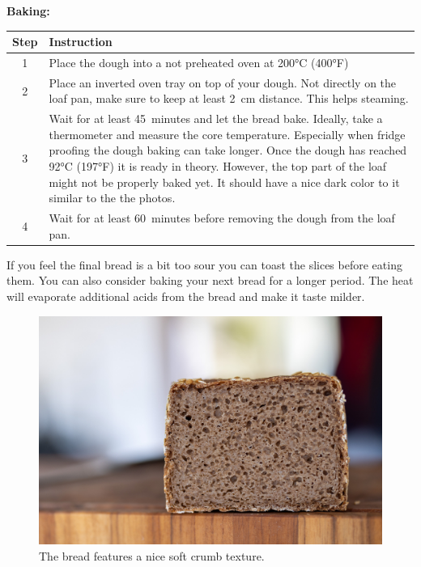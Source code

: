 \noindent\textbf{Baking:}
\begin{center}
\begin{tabular}{|c|p{12cm}|}
    \hline
    \textbf{Step} & \textbf{Instruction} \\
    \hline
    1 & Place the dough into a not preheated oven at 200°C (400°F) \\
    \hline
    2 & Place an inverted oven tray on top of your dough. Not directly
    on the loaf pan, make sure to keep at least 2~cm distance. This
    helps steaming. \\
    \hline
    3 & Wait for at least 45~minutes and let the bread bake. Ideally, take
    a thermometer and measure the core temperature. Especially when fridge
    proofing the dough baking can take longer. Once the dough has
    reached 92°C (197°F) it is ready in theory. However, the top part of the loaf
    might not be properly baked yet. It should have a nice dark color to it
    similar to the the photos. \\
    \hline
    4 & Wait for at least 60~minutes before removing the dough from the loaf pan. \\
    \hline
\end{tabular}
\end{center}

If you feel the final bread is a bit too sour you can toast the slices before
eating them. You can also consider baking your next bread for a longer period.
The heat will evaporate additional acids from the bread and make it taste milder.

\begin{figure}[h]
    \centering
    \includegraphics[width=\textwidth]{whole-grain-sandwich-crumb}
    \caption{The bread features a nice soft crumb texture.}
\end{figure}

